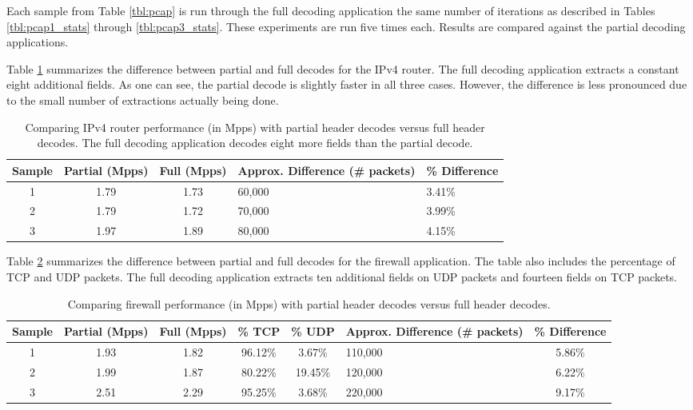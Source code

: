 Each sample from Table \ref{tbl:pcap} is run through the full decoding application the same number of iterations as described in Tables \ref{tbl:pcap1_stats} through \ref{tbl:pcap3_stats}. These experiments are run five times each. Results are compared against the partial decoding applications.

Table \ref{tbl:router_cmp} summarizes the difference between partial and full decodes for the IPv4 router. The full decoding application extracts a constant eight additional fields. As one can see, the partial decode is slightly faster in all three cases. However, the difference is less pronounced due to the small number of extractions actually being done.

\begin{table}[ht]
\caption{Comparing IPv4 router performance (in Mpps) with partial header decodes versus full header decodes. The full decoding application decodes eight more fields than the partial decode.}
\begin{center}
\begin{tabularx}{\textwidth}{| c || c | c | X | X |}
\hline
Sample & Partial (Mpps) & Full (Mpps) & Approx. Difference (\# packets) & \% Difference \\
\hline
1 & 1.79 & 1.73 & 60,000 & 3.41\% \\
\hline
2 & 1.79 & 1.72 & 70,000 & 3.99\% \\
\hline
3 & 1.97 & 1.89 & 80,000 & 4.15\% \\ 
\hline
\end{tabularx}
\end{center}
\label{tbl:router_cmp}
\end{table}

Table \ref{tbl:firewall_cmp} summarizes the difference between partial and full decodes for the firewall application. The table also includes the percentage of TCP and UDP packets. The full decoding application extracts ten additional fields on UDP packets and fourteen fields on TCP packets. 

\begin{table}
\caption{Comparing firewall performance (in Mpps) with partial header decodes versus full header decodes.}
\begin{center}
\begin{tabularx}{\linewidth}{| c || c | c | c | c | X | c |}
\hline
Sample & Partial (Mpps) & Full (Mpps) & \% TCP & \% UDP & Approx. Difference (\# packets) & \% Difference \\
\hline
1 & 1.93 & 1.82 & 96.12\% & 3.67\% & 110,000 & 5.86\% \\
\hline
2 & 1.99 & 1.87 & 80.22\% & 19.45\% & 120,000 & 6.22\% \\
\hline
3 & 2.51 & 2.29 & 95.25\% & 3.68\% & 220,000 & 9.17\% \\ 
\hline
\end{tabularx}
\end{center}
\label{tbl:firewall_cmp}
\end{table}

